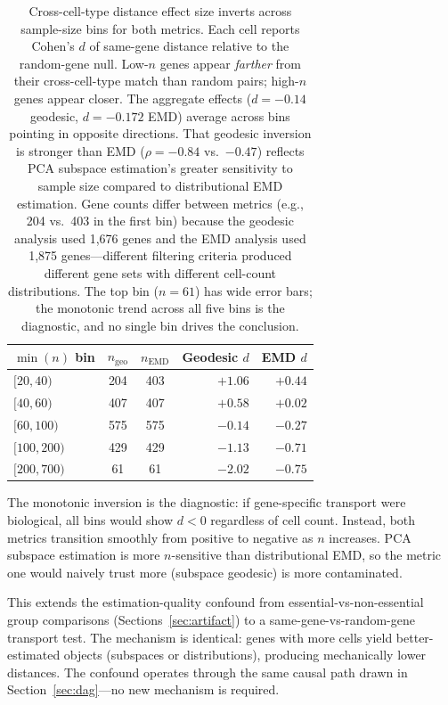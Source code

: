 \documentclass[11pt]{article}
\begin{document}
\begin{table}[h]
\centering
\caption{Cross-cell-type distance effect size inverts across
sample-size bins for both metrics. Each cell reports Cohen's $d$ of
same-gene distance relative to the random-gene null. Low-$n$ genes
appear \emph{farther} from their cross-cell-type match than random
pairs; high-$n$ genes appear closer. The aggregate effects ($d = -0.14$
geodesic, $d = -0.172$ EMD) average across bins pointing in opposite
directions. That geodesic inversion is stronger than EMD ($\rho =
-0.84$ vs.\ $-0.47$) reflects PCA subspace estimation's greater
sensitivity to sample size compared to distributional EMD estimation.
Gene counts differ between metrics (e.g., 204 vs.\ 403 in the first
bin) because the geodesic analysis used 1{,}676 genes and the EMD
analysis used 1{,}875 genes---different filtering criteria produced
different gene sets with different cell-count distributions. The
top bin ($n = 61$) has wide error bars; the monotonic trend across
all five bins is the diagnostic, and no single bin drives the
conclusion.}
\label{tab:transport_bins}
\begin{tabular}{lccrr}
\toprule
$\min(n)$ bin & $n_{\text{geo}}$ & $n_{\text{EMD}}$ & Geodesic $d$ & EMD $d$ \\
\midrule
$[20, 40)$   & 204 & 403  & $+1.06$ & $+0.44$ \\
$[40, 60)$   & 407 & 407  & $+0.58$ & $+0.02$ \\
$[60, 100)$  & 575 & 575  & $-0.14$ & $-0.27$ \\
$[100, 200)$ & 429 & 429  & $-1.13$ & $-0.71$ \\
$[200, 700)$ & 61  & 61   & $-2.02$ & $-0.75$ \\
\bottomrule
\end{tabular}
\end{table}

The monotonic inversion is the diagnostic: if gene-specific transport
were biological, all bins would show $d < 0$ regardless of cell count.
Instead, both metrics transition smoothly from positive to negative as
$n$ increases. PCA subspace estimation is more $n$-sensitive than
distributional EMD, so the metric one would naively trust more
(subspace geodesic) is more contaminated.

This extends the estimation-quality confound from
essential-vs-non-essential group comparisons
(Sections~\ref{sec:artifact}) to a same-gene-vs-random-gene transport
test. The mechanism is identical: genes with more cells yield
better-estimated objects (subspaces or distributions), producing
mechanically lower distances. The confound operates through the same
causal path drawn in Section~\ref{sec:dag}---no new mechanism is
required.
\end{document}
